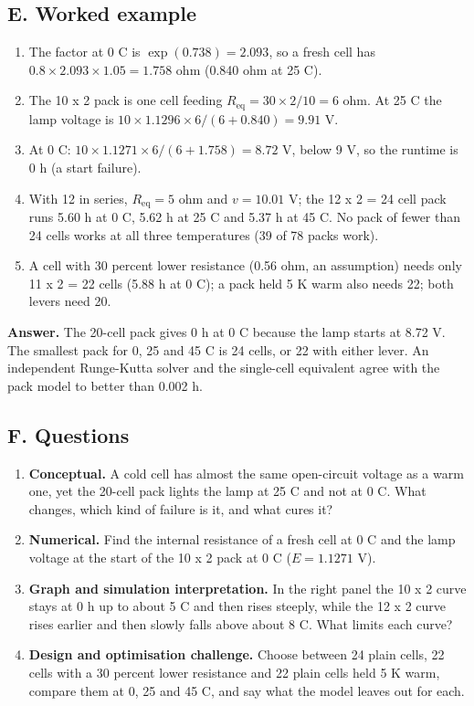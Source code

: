 \documentclass[11pt,a4paper]{article}
\begin{document}
\subsection*{E. Worked example}
\begin{enumerate}[nosep]
\item The factor at 0 C is $\exp(0.738)=2.093$, so a fresh cell has $0.8\times2.093\times1.05=1.758$ ohm (0.840 ohm at 25 C).
\item The 10 x 2 pack is one cell feeding $R_{\mathrm{eq}}=30\times2/10=6$ ohm. At 25 C the lamp voltage is $10\times1.1296\times6/(6+0.840)=9.91$ V.
\item At 0 C: $10\times1.1271\times6/(6+1.758)=8.72$ V, below 9 V, so the runtime is 0 h (a start failure).
\item With 12 in series, $R_{\mathrm{eq}}=5$ ohm and $v=10.01$ V; the 12 x 2 = 24 cell pack runs 5.60 h at 0 C, 5.62 h at 25 C and 5.37 h at 45 C. No pack of fewer than 24 cells works at all three temperatures (39 of 78 packs work).
\item A cell with 30 percent lower resistance (0.56 ohm, an assumption) needs only 11 x 2 = 22 cells (5.88 h at 0 C); a pack held 5 K warm also needs 22; both levers need 20.
\end{enumerate}
\textbf{Answer.} The 20-cell pack gives 0 h at 0 C because the lamp starts at 8.72 V. The smallest pack for 0, 25 and 45 C is 24 cells, or 22 with either lever. An independent Runge-Kutta solver and the single-cell equivalent agree with the pack model to better than 0.002 h.

\subsection*{F. Questions}
\begin{enumerate}[nosep]
\item \textbf{Conceptual.} A cold cell has almost the same open-circuit voltage as a warm one, yet the 20-cell pack lights the lamp at 25 C and not at 0 C. What changes, which kind of failure is it, and what cures it?
\item \textbf{Numerical.} Find the internal resistance of a fresh cell at 0 C and the lamp voltage at the start of the 10 x 2 pack at 0 C ($E=1.1271$ V).
\item \textbf{Graph and simulation interpretation.} In the right panel the 10 x 2 curve stays at 0 h up to about 5 C and then rises steeply, while the 12 x 2 curve rises earlier and then slowly falls above about 8 C. What limits each curve?
\item \textbf{Design and optimisation challenge.} Choose between 24 plain cells, 22 cells with a 30 percent lower resistance and 22 plain cells held 5 K warm, compare them at 0, 25 and 45 C, and say what the model leaves out for each.
\end{enumerate}
\end{document}
